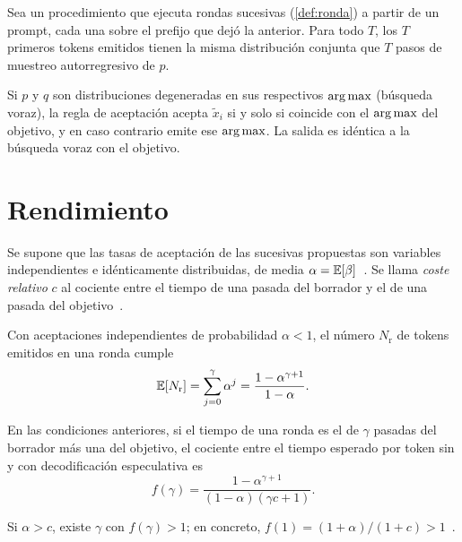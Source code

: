 \begin{teorema}\label{teo:especulativa-secuencias}
Sea un procedimiento que ejecuta rondas sucesivas (\cref{def:ronda}) a partir de un prompt, cada una sobre el prefijo que dejó la anterior. Para todo $T$, los $T$ primeros tokens emitidos tienen la misma distribución conjunta que $T$ pasos de muestreo autorregresivo de $p$.
\end{teorema}

\begin{corolario}\label{cor:voraz}
Si $p$ y $q$ son distribuciones degeneradas en sus respectivos $\operatorname*{arg\,max}$ (búsqueda voraz), la regla de aceptación acepta $\tilde x_i$ si y solo si coincide con el $\operatorname*{arg\,max}$ del objetivo, y en caso contrario emite ese $\operatorname*{arg\,max}$. La salida es idéntica a la búsqueda voraz con el objetivo.
\end{corolario}

\section{Rendimiento}

\begin{definicion}
Se supone que las tasas de aceptación de las sucesivas propuestas son variables independientes e idénticamente distribuidas, de media $\alpha=\mathbb{E}[\beta]$~\cite[§3.1]{leviathan}. Se llama \emph{coste relativo} $c$ al cociente entre el tiempo de una pasada del borrador y el de una pasada del objetivo~\cite[definición~3.7]{leviathan}.
\end{definicion}

\begin{teorema}\label{teo:tokens-ronda}
Con aceptaciones independientes de probabilidad $\alpha<1$, el número $N_{\mathrm{r}}$ de tokens emitidos en una ronda cumple
\[
\mathbb{E}[N_{\mathrm{r}}]=\sum_{j=0}^{\gamma}\alpha^{j}=\frac{1-\alpha^{\gamma+1}}{1-\alpha}.
\]
\end{teorema}

\begin{teorema}\label{teo:mejora}
En las condiciones anteriores, si el tiempo de una ronda es el de $\gamma$ pasadas del borrador más una del objetivo, el cociente entre el tiempo esperado por token sin y con decodificación especulativa es
\[
f(\gamma)=\frac{1-\alpha^{\gamma+1}}{(1-\alpha)(\gamma c+1)}.
\]
\end{teorema}

\begin{corolario}\label{cor:alpha-c}
Si $\alpha>c$, existe $\gamma$ con $f(\gamma)>1$; en concreto, $f(1)=(1+\alpha)/(1+c)>1$~\cite[corolario~3.9]{leviathan}.
\end{corolario}

